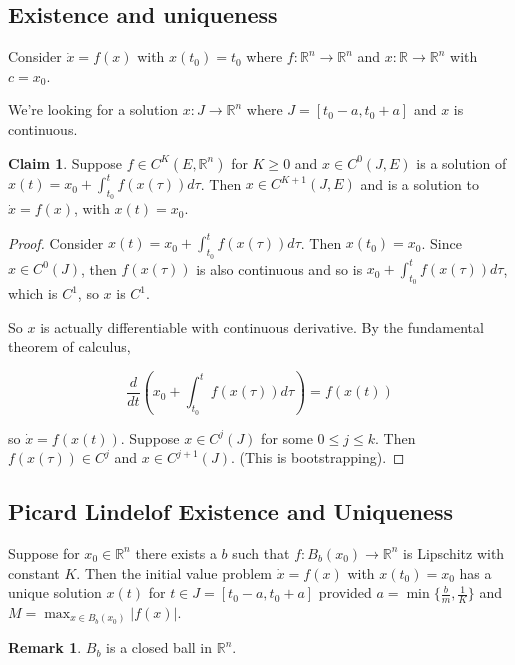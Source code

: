\documentclass[12pt]{article}
\theoremstyle{definition}
\newtheorem*{claim}{Claim}
\newtheorem*{remark}{Remark}
\begin{document}
\subsection{Existence and uniqueness}

Consider $\dot{x} = f(x)$ with $x(t_0) = t_0$ where
$f:\mathbb{R}^n \rightarrow \mathbb{R}^n$ and
$x:\mathbb{R} \rightarrow \mathbb{R}^n$ with $c = x_0$.

We're looking for a solution $x:J \rightarrow \mathbb{R}^n$ where
$J = [t_0 - a, t_0 + a]$ and $x$ is continuous.

\begin{claim}
Suppose $f \in C^K (E, \mathbb{R}^n)$ for $K \geq 0$
and $x \in C^0(J,E)$ is a solution of $x(t) = x_0 + \int^{t}_{t_0} f(x(\tau))d\tau$.
Then $x \in C^{K+1}(J,E)$ and is a solution to $\dot{x} = f(x)$, with $x(t) = x_0$.
\end{claim}

\begin{proof}
Consider $x(t) = x_0 + \int^{t}_{t_0} f(x(\tau))d\tau$. Then $x(t_0) = x_0$. Since 
$x \in C^0(J)$, then $f(x(\tau))$ is also continuous and so is
$x_0 + \int^{t}_{t_0} f(x(\tau))d\tau$, which is $C^1$, so $x$ is $C^1$.

So $x$ is actually differentiable with continuous derivative. By the fundamental
theorem of calculus,

\[
\frac{d}{dt} \left( x_0 + \int^{t}_{t_0} f(x(\tau))d\tau \right) = f(x(t))
\]

so $\dot{x} = f(x(t))$. Suppose $x \in C^j(J)$ for some $0 \leq j \leq k$. Then
$f(x(\tau)) \in C^j$ and $x \in C^{j+1}(J)$. (This is bootstrapping).
\end{proof}


\subsection{Picard Lindelof Existence and Uniqueness}

Suppose for $x_0 \in \mathbb{R}^n$ there exists a $b$ such that
$f:B_b(x_0) \rightarrow \mathbb{R}^n$ is Lipschitz with constant $K$. Then
the initial value problem $\dot{x} = f(x)$ with $x(t_0) = x_0$ has a unique
solution $x(t)$ for $t \in J = [t_0 - a, t_0 + a]$ provided
$a = \min\{\frac{b}{m}, \frac{1}{K}\}$ and 
$\displaystyle M = \max_{x \in B_b(x_0)} |f(x)|$.

\begin{remark}
$B_b$ is a closed ball in $\mathbb{R}^n$.
\end{remark}
\end{document}
